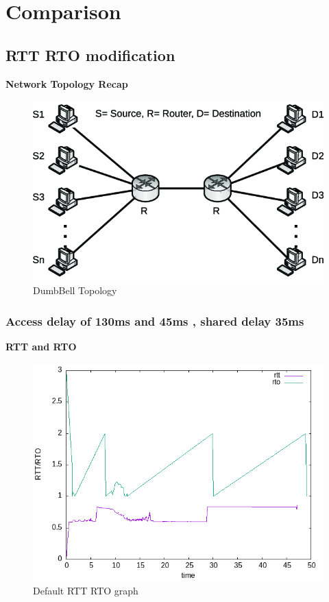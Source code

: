 \documentclass{article}[12pt]
\begin{document}
\section{Comparison}
\subsection{RTT RTO modification}
\textbf{Network Topology Recap}
    \begin{figure}[H]
	\centering
	\includegraphics[width=\textwidth]{Pictures/dumbel.png}
	\caption{DumbBell Topology}
\end{figure}   

\newpage

\subsubsection{Access delay of 130ms and 45ms , shared delay 35ms }

\textbf{RTT and RTO }
    \begin{figure}[H]
	\centering
	\includegraphics[height=0.6\textwidth]{Pictures/rtt/130/b/rtt_rto_graph.png}
	\caption{Default RTT RTO graph}
\end{figure}   
\end{document}

